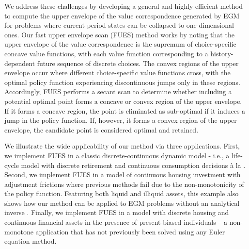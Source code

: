 \documentclass[12pt]{article}
\begin{document}
We address these challenges by developing a general and highly efficient method to compute the upper envelope of the value correspondence generated by EGM for problems where current period states can be collapsed to one-dimensional ones. Our fast upper envelope scan (FUES) method works by noting that the upper envelope of the value correspondence is the supremum of choice-specific concave value functions, with each value function corresponding to a history-dependent future sequence of discrete choices. The convex regions of the upper envelope occur where different choice-specific value functions cross, with the optimal policy function experiencing discontinuous jumps only in these regions. Accordingly, FUES performs a secant scan to determine whether including a potential optimal point forms a concave or convex region of the upper envelope. If it forms a concave region, the point is eliminated as sub-optimal if it induces a jump in the policy function. If, however, it forms a convex region of the upper envelope, the candidate point is considered optimal and retained.
 
We illustrate the wide applicability of our method via three applications. First, we implement FUES in a classic discrete-continuous dynamic model - i.e., a life-cycle model with discrete retirement and continuous consumption decisions \`a la \cite{Iskhakov2017}. Second, we implement FUES in a model of continuous housing investment with adjustment frictions where previous methods fail due to the non-monotonicity of the policy function. Featuring both liquid and illiquid assets, this example also shows how our method can be applied to EGM problems without an analytical inverse \citep{Iskhakov2015}. Finally, we implement FUES in a model with discrete housing and continuous financial assets \citep{Fella2014} in the presence of present-biased \citep{laibson21997} individuals -- a non-monotone application that has not previously been solved using any Euler equation method. 
\end{document}
